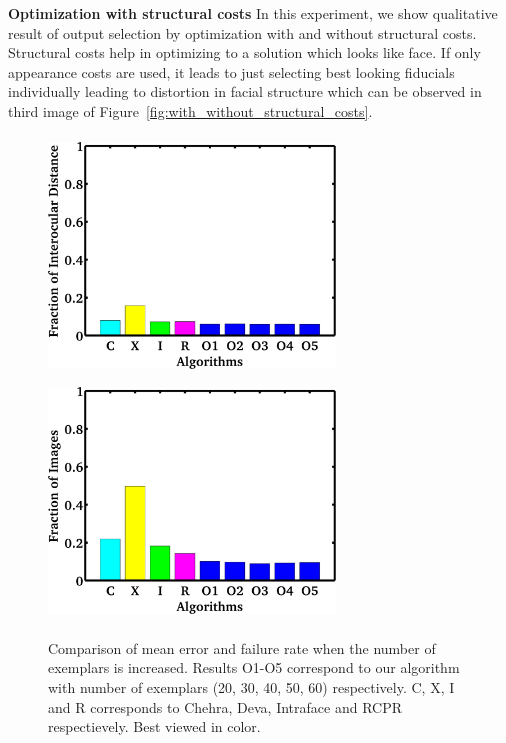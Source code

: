 \textbf{Optimization with structural costs}
\label{subsec:with_without_structural_costs}
In this experiment, we show qualitative result of output selection by optimization with and without
structural costs. Structural costs help in optimizing to a solution which looks like face. If only
appearance costs are used, it leads to just selecting best looking fiducials individually leading to distortion in facial structure which can be observed in third image of Figure~\ref{fig:with_without_structural_costs}.

\begin{figure}
  \centering
  \includegraphics[width=3.0in,height=2.5in]{fid/figures/iccv_version_one/cofw/num_of_exemplars/mean_err_modified.jpg}
  \includegraphics[width=3.0in,height=2.5in]{fid/figures/iccv_version_one/cofw/num_of_exemplars/fail_rate_modified.jpg}
  \caption{ Comparison of mean error and failure rate when the number of exemplars is increased.
  Results O1-O5 correspond to our algorithm with number of exemplars (20, 30, 40, 50, 60) respectively. 
  C, X, I and R corresponds to Chehra, Deva, Intraface and RCPR respectievely.
  Best viewed in color. }
  \label{fig:num_exemplars}
\end{figure}

 
